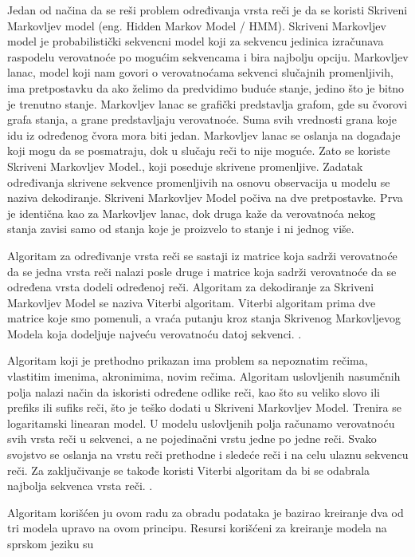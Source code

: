 \documentclass[12pt,oneside]{memoir}
\begin{document}
Jedan od načina da se reši problem određivanja vrsta reči je da se koristi Skriveni Markovljev model (eng. Hidden Markov Model / HMM).  Skriveni Markovljev model je probabilistički sekvencni model koji za sekvencu jedinica izračunava raspodelu verovatnoće po mogućim sekvencama i bira najbolju opciju.  Markovljev lanac,  model koji nam govori o verovatnoćama sekvenci slučajnih promenljivih,  ima pretpostavku da ako želimo da predvidimo buduće stanje,  jedino što je bitno je trenutno stanje.  Markovljev lanac se grafički predstavlja grafom, gde su čvorovi grafa stanja, a grane predstavljaju verovatnoće.  Suma svih vrednosti grana koje idu iz određenog čvora mora biti jedan.  Markovljev lanac se oslanja na događaje koji mogu da se posmatraju,  dok u slučaju reči to nije moguće.  Zato se koriste Skriveni Markovljev Model., koji poseduje skrivene promenljive.  Zadatak određivanja skrivene sekvence promenljivih na osnovu observacija u modelu se naziva dekodiranje.  Skriveni Markovljev Model počiva na dve pretpostavke.  Prva je identična kao za Markovljev lanac, dok druga kaže da verovatnoća nekog stanja zavisi samo od stanja koje je proizvelo to stanje i ni jednog više.  

Algoritam za određivanje vrsta reči se sastaji iz matrice koja sadrži verovatnoće da se jedna vrsta reči nalazi posle druge i matrice koja sadrži verovatnoće da se određena vrsta dodeli određenoj reči.  Algoritam za dekodiranje za Skriveni Markovljev Model se naziva Viterbi algoritam.  Viterbi algoritam prima dve matrice koje smo pomenuli, a vraća putanju kroz stanja Skrivenog Markovljevog Modela koja dodeljuje najveću verovatnoću datoj sekvenci.  \cite{postagging}.

Algoritam koji je prethodno prikazan ima problem sa nepoznatim rečima,  vlastitim imenima,  akronimima,  novim rečima.  Algoritam uslovljenih nasumčnih polja nalazi način da iskoristi određene odlike reči,  kao što su veliko slovo ili prefiks ili sufiks reči,  što je teško dodati u Skriveni Markovljev Model.  Trenira se logaritamski linearan model.  U modelu uslovljenih polja računamo verovatnoću svih vrsta reči u sekvenci,  a ne pojedinačni vrstu jedne po jedne reči.  Svako svojstvo se oslanja na vrstu reči prethodne i sledeće reči i na celu ulaznu sekvencu reči.  Za zaključivanje se takođe koristi Viterbi algoritam da bi se odabrala najbolja sekvenca vrsta reči.  \cite{postagging}.

Algoritam korišćen ju ovom radu za obradu podataka je bazirao kreiranje dva od tri modela upravo na ovom principu.  Resursi korišćeni za kreiranje modela na sprskom jeziku su 
\end{document}
